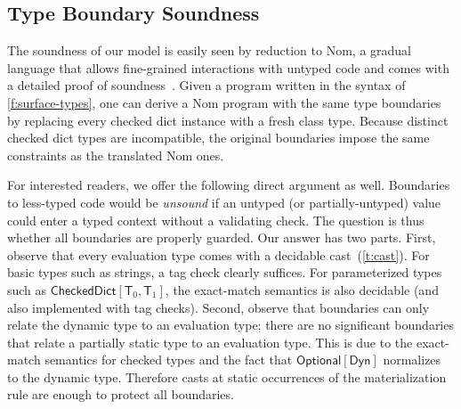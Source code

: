 \documentclass[english,cleveref,submission]{programming}
\newcommand{\code}[1]{\texttt{#1}}
\newcommand{\spapp}[2]{#1\,(#2)}
\newcommand{\spann}[2]{#1\!:\!#2}
\newcommand{\typefont}[1]{\mathsf{#1}}
\newcommand{\codefont}[1]{\emph{#1}}
\newcommand{\paramtype}[2]{#1[#2]}
\newcommand{\spteval}{\typefont{T}}
\newcommand{\sptclass}{\typefont{C}}
\newcommand{\sptdyn}{\typefont{Dyn}}
\newcommand{\sptoptional}[1]{\paramtype{\typefont{Optional}}{#1}}
\newcommand{\sptrawchkdict}{\typefont{CheckedDict}} %
\newcommand{\sptchkdict}[2]{\paramtype{\sptrawchkdict}{#1, #2}}
\newcommand{\sptenv}{\typefont{Env}}
\newcommand{\sptvardef}[2]{\spann{#1}{#2}}
\newcommand{\spx}{\code{x}}
\newcommand{\spf}{\code{f}}
\newcommand{\spc}{\sptclass}
\newcommand{\spexpr}{\codefont{expr}}
\newcommand{\vdashsub}[1]{\vdash_{#1}}
\newcommand{\wtprog}{\vdashsub{\mathbf{P}}}
\newcommand{\wtexpr}{\vdashsub{\mathbf{E}}}
\newcommand{\spvardef}[3]{\sptvardef{#1}{#2} = #3}
\newcommand{\spfundef}[4]{\mathrm{def}~\spapp{#1}{#2}\code{ -> }#3: #4}
\newcommand{\spclassdef}[4]{\mathrm{class}~\spapp{#1}{#2}:~#3;~#4}
\newcommand{\spself}{\code{self}}
\begin{document}
%


\subsection{Type Boundary Soundness}
\label{s:ts}

The soundness of our model is easily seen by reduction to Nom, a gradual
language that allows fine-grained interactions with untyped code and comes with
a detailed proof of soundness~\cite{mt-oopsla-2017,mt-oopsla-2021}.
Given a program written in the syntax of \cref{f:surface-types}, one can derive
a Nom program with the same type boundaries by replacing every checked
dict instance with a fresh class type.
Because distinct checked dict types are incompatible, the
original boundaries impose the same constraints as the translated Nom ones.

For interested readers, we offer the following direct argument as well.
Boundaries to less-typed code would be \emph{unsound} if an untyped
(or partially-untyped) value could enter a typed context without
a validating check.
The question is thus whether all boundaries are properly guarded.
Our answer has two parts.
First, observe that every evaluation type comes with a decidable
cast~(\cref{t:cast}).
For basic types such as strings, a tag check clearly suffices.
For parameterized types such as $\sptchkdict{\spteval_0}{\spteval_1}$,
the exact-match semantics is also decidable (and also implemented with
tag checks).
Second, observe that boundaries can only relate the dynamic type to an
evaluation type; there are no significant boundaries that relate a partially
static type to an evaluation type.
This is due to the exact-match semantics for checked types and the fact that
$\sptoptional{\sptdyn}$ normalizes to the dynamic type.
Therefore casts at static occurrences of the materialization rule are
enough to protect all boundaries.
\end{document}
